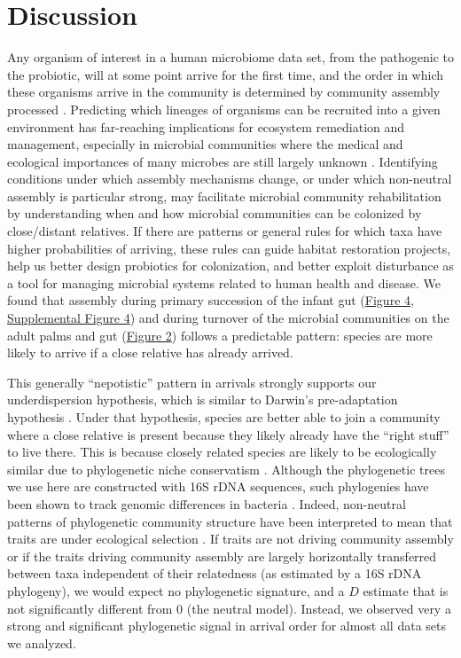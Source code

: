 \documentclass{article}
\begin{document}
\section{Discussion}
Any organism of interest in a human microbiome data set, from the pathogenic to the probiotic, will at some point arrive for the first time, 
and the order in which these organisms arrive 
in the community is determined by community assembly 
processed \cite{Nemergut2013}. Predicting which lineages of organisms can be recruited into a given environment has far-reaching implications for ecosystem remediation and management, especially in microbial communities where the medical and ecological importances of many microbes are still largely unknown \cite{Martiny2015,Vazquez-Baeza2018}. Identifying conditions under which assembly mechanisms change, or under which non-neutral assembly is particular strong, may facilitate microbial community rehabilitation by understanding when and how microbial communities can be colonized by close/distant relatives. If there are patterns or general rules for which taxa have higher probabilities of arriving, these rules can guide habitat restoration projects, help us better design probiotics for colonization, and better exploit disturbance as a tool for managing microbial systems related to human health and disease. We found that assembly during primary succession of the infant gut (\hyperref[sec:figure4]{Figure 4}, \hyperref[sec:figureS4]{Supplemental Figure 4}) and during turnover of the microbial communities on the adult palms and gut (\hyperref[sec:figure2]{Figure 2}) follows a predictable pattern: species are more likely to arrive if a close relative has already arrived.
\par
This generally “nepotistic” pattern in arrivals strongly supports our underdispersion hypothesis, which is similar to Darwin’s pre-adaptation hypothesis \cite{Darwin1859}. Under that hypothesis, species are better able to join a community where a close relative is present because they likely already have the “right stuff” to live there. This is because closely related species are likely to be ecologically similar due to phylogenetic niche conservatism \cite{Wiens2010}. Although the phylogenetic trees we use here are constructed with 16S rDNA sequences, such phylogenies have been shown to track genomic differences in bacteria \cite{Zaneveld2010,Langille2013}. Indeed, non-neutral patterns of phylogenetic community structure have been interpreted to mean that traits are under ecological selection \cite{Webb2000,Webb2002,CavenderBares2004,Gerhold2015}. If traits are not driving community assembly \cite{Hubbell2001} or if the traits driving community assembly are largely horizontally transferred between taxa independent of their relatedness (as estimated by a 16S rDNA phylogeny), we would expect no phylogenetic signature, and a \(D\) estimate that is not significantly different from 0 (the neutral model). Instead, we observed very a strong and significant phylogenetic signal in arrival order for almost all data sets we analyzed.
\end{document}
